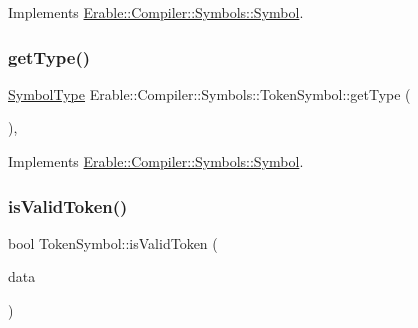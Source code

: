 Implements \mbox{\hyperlink{class_erable_1_1_compiler_1_1_symbols_1_1_symbol_a63b41d0942e5d65288fa3fc9d466ab43}{Erable\+::\+Compiler\+::\+Symbols\+::\+Symbol}}.

\mbox{\label{class_erable_1_1_compiler_1_1_symbols_1_1_token_symbol_a2cb212d21b563d12f1ac1a823e047bfe}} 
\subsubsection{\texorpdfstring{getType()}{getType()}\hspace{0.1cm}{\footnotesize\ttfamily [2/2]}}
{\footnotesize\ttfamily \mbox{\hyperlink{namespace_erable_1_1_compiler_1_1_symbols_a3b60ec10cda0920ec4368128361b8320}{Symbol\+Type}} Erable\+::\+Compiler\+::\+Symbols\+::\+Token\+Symbol\+::get\+Type (\begin{DoxyParamCaption}{ }\end{DoxyParamCaption})\hspace{0.3cm}{\ttfamily [override]}, {\ttfamily [virtual]}}



Implements \mbox{\hyperlink{class_erable_1_1_compiler_1_1_symbols_1_1_symbol_a63b41d0942e5d65288fa3fc9d466ab43}{Erable\+::\+Compiler\+::\+Symbols\+::\+Symbol}}.

\mbox{\label{class_erable_1_1_compiler_1_1_symbols_1_1_token_symbol_af55a8939414a0b0ddf7302f6eb0cc77e}} 
\subsubsection{\texorpdfstring{isValidToken()}{isValidToken()}}
{\footnotesize\ttfamily bool Token\+Symbol\+::is\+Valid\+Token (\begin{DoxyParamCaption}\item[{\mbox{\hyperlink{struct_erable_1_1_compiler_1_1_data_1_1_processed_data}{Data\+::\+Processed\+Data}}}]{data }\end{DoxyParamCaption})}


